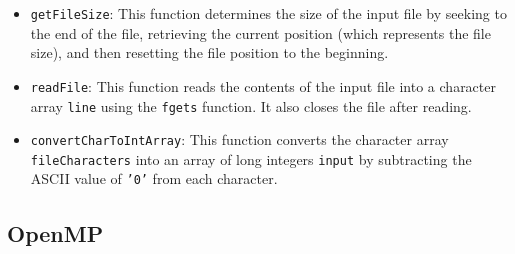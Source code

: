 \begin{itemize}
  \item \texttt{getFileSize}: This function determines the size of the input file by seeking to the end of the file, retrieving the current position (which represents the file size), and then resetting the file position to the beginning.
  \item \texttt{readFile}: This function reads the contents of the input file into a character array \texttt{line} using the \texttt{fgets} function. It also closes the file after reading.
  \item \texttt{convertCharToIntArray}: This function converts the character array \texttt{fileCharacters} into an array of long integers \texttt{input} by subtracting the ASCII value of \texttt{'0'} from each character.
\end{itemize}


\subsection{OpenMP}
